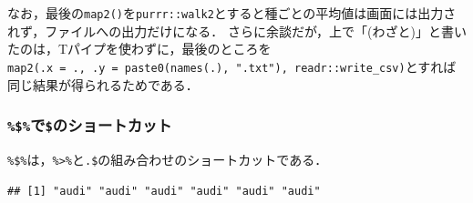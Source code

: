 \documentclass[
]{article}
\newenvironment{Shaded}{\begin{snugshade}}{\end{snugshade}}
\newcommand{\AttributeTok}[1]{\textcolor[rgb]{0.13,0.29,0.53}{#1}}
\newcommand{\FunctionTok}[1]{\textcolor[rgb]{0.13,0.29,0.53}{\textbf{#1}}}
\newcommand{\NormalTok}[1]{#1}
\newcommand{\SpecialCharTok}[1]{\textcolor[rgb]{0.81,0.36,0.00}{\textbf{#1}}}
\newcommand{\StringTok}[1]{\textcolor[rgb]{0.31,0.60,0.02}{#1}}
\begin{document}
なお，最後の\texttt{map2()}を\texttt{purrr::walk2}とすると種ごとの平均値は画面には出力されず，ファイルへの出力だけになる．
さらに余談だが，上で「(わざと)」と書いたのは，Tパイプを使わずに，最後のところを\texttt{map2(.x\ =\ .,\ .y\ =\ paste0(names(.),\ ".txt"),\ readr::write\_csv)}とすれば同じ結果が得られるためである．

\begin{Shaded}
\end{Shaded}

\hypertarget{ux3067ux306eux30b7ux30e7ux30fcux30c8ux30abux30c3ux30c8}{%
\subsubsection{\texorpdfstring{\texttt{\%\$\%}で\texttt{\$}のショートカット}{\%\$\%で\$のショートカット}}\label{ux3067ux306eux30b7ux30e7ux30fcux30c8ux30abux30c3ux30c8}}

\texttt{\%\$\%}は，\texttt{\%\textgreater{}\%}と\texttt{.\$}の組み合わせのショートカットである．

\begin{Shaded}
\end{Shaded}

\begin{verbatim}
## [1] "audi" "audi" "audi" "audi" "audi" "audi"
\end{verbatim}
\end{document}
